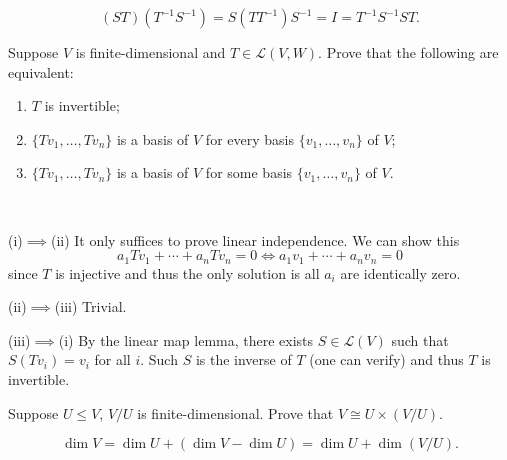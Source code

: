 \begin{solution}
\[(ST)(T^{-1}S^{-1})=S(TT^{-1})S^{-1}=I=T^{-1}S^{-1}ST.\]
\end{solution}

\begin{prbm}
Suppose $V$ is finite-dimensional and $T\in\mathcal{L}(V,W)$. Prove that the following are equivalent:
\begin{enumerate}[label=(\roman*)]
\item $T$ is invertible;
\item $\{Tv_1,\dots,Tv_n\}$ is a basis of $V$ for every basis $\{v_1,\dots,v_n\}$ of $V$;
\item $\{Tv_1,\dots,Tv_n\}$ is a basis of $V$ for some basis $\{v_1,\dots,v_n\}$ of $V$.
\end{enumerate}
\end{prbm}

\begin{solution} \

(i)$\implies$(ii) It only suffices to prove linear independence. We can show this
\[a_1Tv_1+\cdots+a_nTv_n=0\iff a_1v_1+\cdots+a_nv_n=0\]
since $T$ is injective and thus the only solution is all $a_i$ are identically zero.

(ii)$\implies$(iii) Trivial.

(iii)$\implies$(i) By the linear map lemma, there exists $S\in\mathcal{L}(V)$ such that $S(Tv_i)=v_i$ for all $i$. Such $S$ is the inverse of $T$ (one can verify) and thus $T$ is invertible.
\end{solution}

\begin{prbm}
Suppose $U\le V$, $V/U$ is finite-dimensional. Prove that $V\cong U\times(V/U)$.
\end{prbm}

\begin{solution}
\[\dim V=\dim U+(\dim V-\dim U)=\dim U+\dim(V/U).\]
\end{solution}